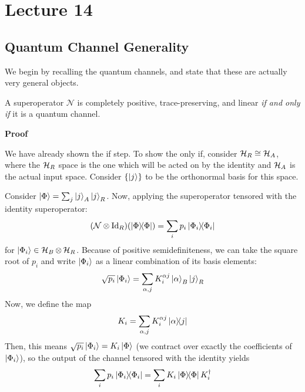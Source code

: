 \section{Lecture 14}

\subsection{Quantum Channel Generality}

We begin by recalling the quantum channels, and state that these are actually very general objects.

\begin{theorem}
    A superoperator $\mathcal{N}$
    is completely positive, trace-preserving, and linear \emph{if and only if} it is a quantum channel.

    \textbf{Proof} %

    We have already shown the if step. To show the only if,
    consider $\mathcal{H}_R \cong \operatorname{\mathcal{H}}_A$, where the $\operatorname{\mathcal{H}}_R$ space is the one
    which will be acted on by the identity and $\operatorname{\mathcal{H}}_A$ is the actual input space.
    Consider $\{\ket{j}\}$ to be the orthonormal basis for this space.

    Consider $\ket{\Phi} = \sum_j \ket{j}_A \ket{j}_R$. Now, applying the superoperator tensored with the identity superoperator:
    \[ \qty(\mathcal{N} \otimes \textrm{Id}_R)\qty(\ketbra{\Phi}) = \sum_i p_i \ketbra{\Phi_i} \]
    for $\ket{\Phi_i} \in \operatorname{\mathcal{H}}_B \otimes \operatorname{\mathcal{H}}_R$. Because of positive semidefiniteness, we can take the square root of $p_i$
    and write $\ket{\Phi_i}$ as a linear combination of its basis elements:
    \[ \sqrt{p_i} \ket{\Phi_i} = \sum_{\alpha, j} K_i^{\alpha j} \ket{\alpha}_B \ket{j}_R \]
    Now, we define the map
    \[ K_i = \sum_{\alpha, j} K_i^{\alpha j} \ketbra{\alpha}{j} \]
    Then, this means $\sqrt{p_i} \ket{\Phi_i} = K_i \ket{\Phi}$ (we contract over exactly the coefficients of $\ket{\Phi_i}$),
    so the output of the channel tensored with the identity yields
    \[ \sum_i p_i \ketbra{\Phi_i} = \sum_i K_i \ketbra{\Phi} K_i^{\dagger} \]


\end{theorem}

